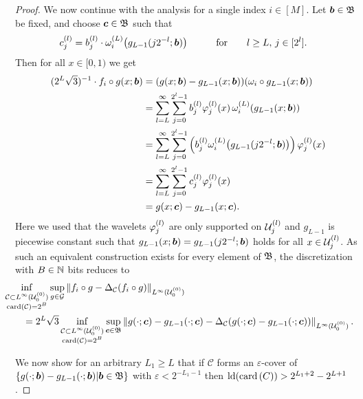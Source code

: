 \documentclass[10pt,a4paper]{amsart}
\newcommand{\set}[1]{\ensuremath{\mathcal{#1}}}
\begin{document}
\begin{proof}
We now continue with the analysis for a single index $i\in[M]$.
Let $\coeff\in\CoeffSpace$ be fixed, and choose $\coeffC\in\CoeffSpace$ such that
\begin{alignat}{2}
    \coeffC[l][j]&=\coeff[l][j]\cdot\walsh{L}{i}(g_{L-1}(j2^{-l};\coeff))\qquad&&\text{for}\qquad l\geq L,\,j\in[2^l].
\end{alignat}
Then for all $x\in [0,1)$ we get
\begin{align}
    (2^{L}\sqrt{3})^{-1}\cdot f_i\circ g(x;\coeff)&=(g(x;\coeff)-g_{L-1}(x;\coeff))(\omega_i\circ g_{L-1}(x;\coeff))
    \\&
    =
    \sum_{l=L}^\infty\sum_{j=0}^{2^l-1}\coeff[l][j]\wavelet[l][j](x) \walsh{L}{i}(g_{L-1}(x;\coeff))
    \\&
    =
    \sum_{l=L}^\infty\sum_{j=0}^{2^l-1}\left(\coeff[l][j] \walsh{L}{i}(g_{L-1}(j2^{-l};\coeff))\right)\wavelet[l][j](x)
    \\&
    =
    \sum_{l=L}^\infty\sum_{j=0}^{2^l-1}\coeffC[l][j]\wavelet[l][j](x)
    \\&
    =
    g(x;\coeffC)-g_{L-1}(x;\coeffC).
\end{align}
Here we used that the wavelets $\wavelet[l][j]$ are only supported on $\dyadicU{l}{j}$ and $g_{L-1}$ is piecewise constant such that $g_{L-1}(x;\coeff)=g_{L-1}(j2^{-l};\coeff)$ holds for all $x\in\dyadicU{l}{j}$.
As such an equivalent construction exists for every element of $\CoeffSpace$, the discretization with $B\in\nn$ bits reduces to
\begin{align}
    &\kern-2em\inf_{\substack{\set{C}\subset L^\infty(\dyadicU{0}{0})\\\card{\set{C}}=2^B}}\sup_{g\in\RadHaarSpace}\norm{f_i\circ g-\Delta_{\set{C}}(f_i\circ g)}[{L^\infty(\dyadicU{0}{0})}]
    \\&
    =
    2^L\sqrt{3}\inf_{\substack{\set{C}\subset L^\infty(\dyadicU{0}{0})\\\card{\set{C}}=2^B}}\sup_{\coeffC\in\CoeffSpace}\norm{g(\cdot;\coeffC)-g_{L-1}(\cdot;\coeffC)-\Delta_{\set{C}}(g(\cdot;\coeffC)-g_{L-1}(\cdot;\coeffC))}[{L^\infty(\dyadicU{0}{0})}].
\end{align}

We now show for an arbitrary $L_1\geq L$ that if $\set{C}$ forms an $\varepsilon$-cover of $\{g(\cdot;\coeff)-g_{L-1}(\cdot;\coeff)|\coeff\in\CoeffSpace\}$ with $\varepsilon<2^{-L_1-1}$ then $\operatorname{ld}(\operatorname{card}\left(C\right))> 2^{L_1+2}-2^{L+1}$.


\end{proof}
\end{document}
